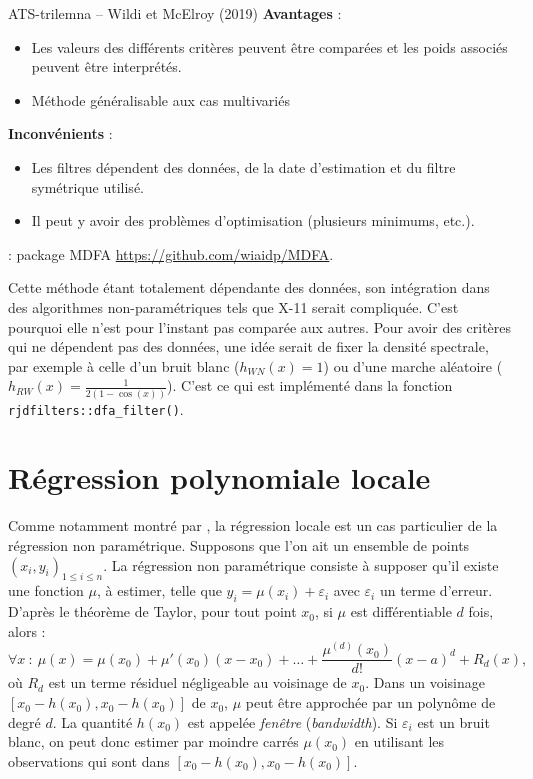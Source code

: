\documentclass[
  11pt,
  french,
  a4paper]{article}
\newcommand\1{\mathds{1}}
\begin{document}
\begin{summary_box}{ATS-trilemna -- Wildi et McElroy (2019)}
\textbf{Avantages} :

\begin{itemize}
\item
  Les valeurs des différents critères peuvent être comparées et les poids associés peuvent être interprétés.
\item
  Méthode généralisable aux cas multivariés
\end{itemize}

\textbf{Inconvénients }:

\begin{itemize}
\item
  Les filtres dépendent des données, de la date d'estimation et du filtre symétrique utilisé.
\item
  Il peut y avoir des problèmes d'optimisation (plusieurs minimums, etc.).
\end{itemize}

\textbf{} : package MDFA \url{https://github.com/wiaidp/MDFA}.

\end{summary_box}

Cette méthode étant totalement dépendante des données, son intégration dans des algorithmes non-paramétriques tels que X-11 serait compliquée.
C'est pourquoi elle n'est pour l'instant pas comparée aux autres.
Pour avoir des critères qui ne dépendent pas des données, une idée serait de fixer la densité spectrale, par exemple à celle d'un bruit blanc (\(h_{WN}(x)=1\)) ou d'une marche aléatoire (\(h_{RW}(x)=\frac{1}{2(1-\cos(x))}\)).
C'est ce qui est implémenté dans la fonction \texttt{rjdfilters::dfa\_filter()}.

\hypertarget{sec-lppfilters}{%
\section{Régression polynomiale locale}\label{sec-lppfilters}}

Comme notamment montré par \textcite{Loader1999}, la régression locale est un cas particulier de la régression non paramétrique.
Supposons que l'on ait un ensemble de points \((x_i,y_i)_{1\leq i\leq n}\).
La régression non paramétrique consiste à supposer qu'il existe une fonction \(\mu\), à estimer, telle que \(y_i=\mu(x_i)+\varepsilon_i\) avec \(\varepsilon_i\) un terme d'erreur.
D'après le théorème de Taylor, pour tout point \(x_0\), si \(\mu\) est différentiable \(d\) fois, alors :
\[
\forall x \::\:\mu(x) = \mu(x_0) + \mu'(x_0)(x-x_0)+\dots +
\frac{\mu^{(d)}(x_0)}{d!}(x-a)^d+R_d(x),
\]
où \(R_d\) est un terme résiduel négligeable au voisinage de \(x_0\).
Dans un voisinage \(\left[x_0-h(x_0),x_0-h(x_0)\right]\) de \(x_0\), \(\mu\) peut être approchée par un polynôme de degré \(d\).
La quantité \(h(x_0)\) est appelée \emph{fenêtre} (\emph{bandwidth}).
Si \(\varepsilon_i\) est un bruit blanc, on peut donc estimer par moindre carrés \(\mu(x_0)\) en utilisant les observations qui sont dans \(\left[x_0-h(x_0),x_0-h(x_0)\right]\).
\end{document}
